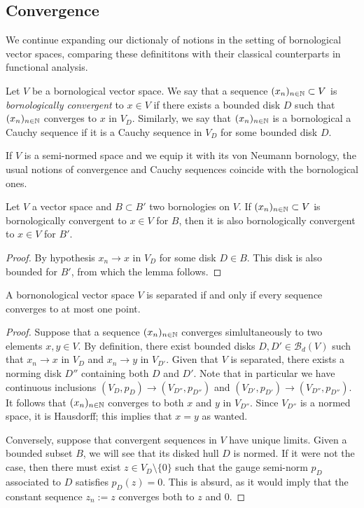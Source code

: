 \subsection{Convergence}

We continue expanding our dictionaly of notions in the
setting of bornological vector spaces, comparing these 
definititons
with their classical counterparts in functional analysis.

Let $V$ be a bornological vector space. We say that 
a sequence $(x_n)_{n \in \mathbb N} \subset V$ is 
\emph{bornologically convergent} to $x \in V$ if there 
exists a bounded disk $D$ such that $(x_n)_{n \in \mathbb N}$ converges
to $x$ in $V_D$. Similarly, we say that $(x_n)_{n \in \mathbb N}$ 
is a bornological a Cauchy sequence if it 
is a Cauchy sequence in $V_D$ for some bounded disk $D$.

\begin{example} \label{ex:conv-semi}
If $V$ is a semi-normed space and we equip it with its
von Neumann bornology, the usual notions of convergence
and Cauchy sequences coincide with the bornological ones. 
\end{example}

\begin{lemma} \label{lem:finer-conv} Let $V$ a vector space and $B \subset B'$
two bornologies on $V$. If $(x_n)_{n \in \mathbb N} \subset V$ is 
bornologically convergent to $x \in V$ for $B$, then it 
is also bornologically convergent to $x \in V$ for $B'$.
\end{lemma}
\begin{proof} By hypothesis $x_n \to x$ in $V_D$
for some disk $D \in B$. This disk is also bounded for $B'$, 
from which the lemma follows.
\end{proof}

\begin{proposition} A 
bornonological vector space $V$ is separated 
if and only if every sequence converges 
to at most one point. 
\end{proposition}
\begin{proof} Suppose that a sequence $(x_n)_{n \in \mathbb N}$ 
converges simlultaneously to two
elements $x,y \in V$. By definition, there exist 
bounded disks $D, D' \in \mathcal B_d(V)$ such that 
$x_n \to x$ in $V_D$ and $x_n \to y$ in $V_{D'}$. 
Given that $V$ is separated, there exists a 
norming disk $D''$ containing both $D$ and $D'$. 
Note that in particular we have continuous
inclusions $(V_D, p_D) \to (V_{D''}, p_{D''})$
and $(V_{D'}, p_{D'}) \to (V_{D''}, p_{D''})$.
It follows that $(x_n)_{n \in \mathbb N}$ converges to both 
$x$ and $y$ in $V_{D''}$. 
Since $V_{D''}$ is a normed space, it is Hausdorff; 
this implies that $x = y$ as wanted.

Conversely, suppose that convergent 
sequences in $V$ have unique limits. 
Given a bounded subset $B$, we will see that its
disked hull $D$ is normed. If it were not the case,
then there must exist $z \in V_D \setminus \{0\}$ such that 
the gauge semi-norm $p_D$
associated to $D$ satisfies 
$p_D(z) = 0$. This is absurd, as it would 
imply that the constant sequence $z_n := z$
converges both to $z$ and $0$. 
\end{proof}

